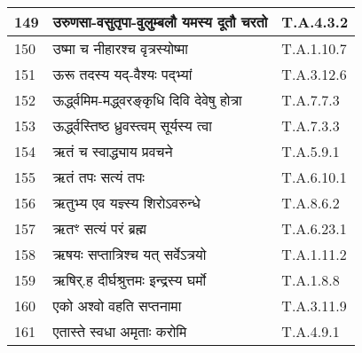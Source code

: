 \documentclass[17pt]{extarticle}
\begin{document}
\begin{longtable}{||p{0.4in}||p{4.9in}||p{0.9in}||}
    149 & उरुणसा{-}वसुतृपा{-}वुलुम्बलौ यमस्य दूतौ चरतो & T.A.4.3.2       \\
    
    \hline
        
    150 & उष्मा च नीहारश्च वृत्रस्योष्मा & T.A.1.10.7       \\
    
    \hline
        
    151 & ऊरू तदस्य यद्{-}वैश्यः पद्भ्यां & T.A.3.12.6       \\
    
    \hline
        
    152 & ऊर्द्ध्वमिम{-}मद्ध्वरङ्कृधि दिवि देवेषु होत्रा & T.A.7.7.3       \\
    
    \hline
        
    153 & ऊर्द्ध्वस्तिष्ठ ध्रुवस्त्वम् सूर्यस्य त्वा & T.A.7.3.3       \\
    
    \hline
        
    154 & ऋतं च स्वाद्ध्याय प्रवचने & T.A.5.9.1       \\
    
    \hline
        
    155 & ऋतं तपः सत्यं तपः & T.A.6.10.1       \\
    
    \hline
        
    156 & ऋतुभ्य एव यज्ञ्स्य शिरोऽवरुन्धे & T.A.8.6.2       \\
    
    \hline
        
    157 & ऋतꣳ सत्यं परं ब्रह्म & T.A.6.23.1       \\
    
    \hline
        
    158 & ऋषयः सप्तात्रिश्च यत् सर्वेऽत्रयो & T.A.1.11.2       \\
    
    \hline
        
    159 & ऋषिर्.ह दीर्घश्रुत्तमः इन्द्रस्य घर्मो & T.A.1.8.8       \\
    
    \hline
        
    160 & एको अश्वो वहति सप्तनामा & T.A.3.11.9       \\
    
    \hline
        
    161 & एतास्ते स्वधा अमृताः करोमि & T.A.4.9.1       \\
    

\end{longtable}
\end{document}
